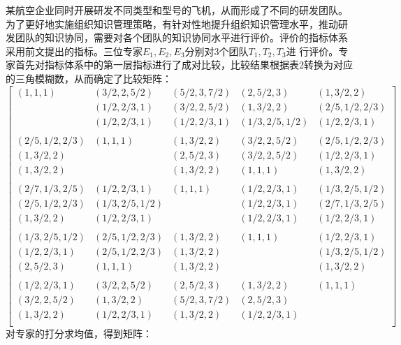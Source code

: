 \documentclass[adobefonts,UTF8]{ctexart}
\begin{document}
某航空企业同时开展研发不同类型和型号的飞机，从而形成了不同的研发团队。
为了更好地实施组织知识管理策略，有针对性地提升组织知识管理水平，推动研
发团队的知识协同，需要对各个团队的知识协同水平进行评价。评价的指标体系
采用前文提出的指标。三位专家$E_1,E_2,E_3$分别对3个团队$T_1,T_2,T_3$进
行评价。专家首先对指标体系中的第一层指标进行了成对比较，比较结果根据表2转换为对应的三角模糊数，从而确定了比较矩阵：
\[
\left[
  \begin{array}{lllll}
(1,1,1)&(3/2,2,5/2)&(5/2,3,7/2)&(2,5/2,3)&(1,3/2,2)\\
       &(1/2,2/3,1)&(3/2,2,5/2)&(1,3/2,2)&(2/5,1/2,2/3)\\
       &(1/2,2/3,1)&(1/2,2/3,1)&(1/3,2/5,1/2)&(1/2,2/3,1)\\
\\
(2/5,1/2,2/3)&(1,1,1)&(1,3/2,2)&(3/2,2,5/2)&(2/5,1/2,2/3)\\
(1,3/2,2)&&(2,5/2,3)&(3/2,2,5/2)&(1/2,2/3,1)\\
(1,3/2,2)&&(1,3/2,2)&(1,1,1)&(1,3/2,2)\\
\\
(2/7,1/3,2/5)&(1/2,2/3,1)&(1,1,1)&(1/2,2/3,1)&(1/3,2/5,1/2)\\
(2/5,1/2,2/3)&(1/3,2/5,1/2)&&(1/2,2/3,1)&(2/7,1/3,2/5)\\
(1,3/2,2)&(1/2,2/3,1)&&(1/2,2/3,1)&(1/2,2/3,1)\\
\\
(1/3,2/5,1/2)&(2/5,1/2,2/3)&(1,3/2,2)&(1,1,1)&(1/2,2/3,1)\\
(1/2,2/3,1)&(2/5,1/2,2/3)&(1,3/2,2)&&(1/3,2/5,1/2)\\
(2,5/2,3)&(1,1,1)&(1,3/2,2)&&(1,3/2,2)\\
\\
(1/2,2/3,1)&(3/2,2,5/2)&(2,5/2,3)&(1,3/2,2)&(1,1,1)\\
(3/2,2,5/2)&(1,3/2,2)&(5/2,3,7/2)&(2,5/2,3)&\\
(1,3/2,2)&(1/2,2/3,1)&(1,3/2,2)&(1/2,2/3,1)&\\

  \end{array}
\right]
\]
对专家的打分求均值，得到矩阵：
\end{document}

